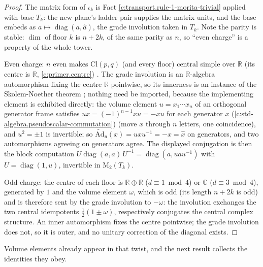 \documentclass[11pt]{article}
\theoremstyle{definition}
\theoremstyle{plain}
\providecommand{\Ad}{}\renewcommand{\Ad}{\widetilde{\mathrm{Ad}}}
\providecommand{\C}{}\renewcommand{\C}{\mathbb{C}}
\providecommand{\Cl}{}\renewcommand{\Cl}{\mathrm{Cl}}
\providecommand{\Mat}{}\renewcommand{\Mat}{\mathrm{M}}
\providecommand{\R}{}\renewcommand{\R}{\mathbb{R}}
\begin{document}
\begin{proof}
The matrix form of $\iota_k$ is Fact \ref{c:transport.rule-1-morita-trivial} applied with base $T_k$: the new plane's ladder pair supplies the matrix units, and the base embeds as $a \mapsto \operatorname{diag}(a, \hat a)$, the grade involution taken in $T_k$. Note the parity is stable: $\dim$ of floor $k$ is $n + 2k$, of the same parity as $n$, so ``even charge'' is a property of the whole tower.

Even charge: $n$ even makes $\Cl(p,q)$ (and every floor) central simple over $\R$ (its centre is $\R$, \ref{c:primer.centre}) \cite{Porteous1995, Lounesto2001}. The grade involution is an $\R$-algebra automorphism fixing the centre $\R$ pointwise, so its innerness is an instance of the Skolem-Noether theorem \cite{Pierce1982}; nothing need be imported, because the implementing element is exhibited directly: the volume element $u = x_1 \cdots x_n$ of an orthogonal generator frame satisfies $u x = (-1)^{n-1} x u = -xu$ for each generator $x$ (\ref{c:std-algebra.pseudoscalar-commutation}) (move $x$ through $n$ letters, one coincidence), and $u^2 = \pm 1$ is invertible; so $\Ad_u(x) = u x u^{-1} = -x = \hat x$ on generators, and two automorphisms agreeing on generators agree. The displayed conjugation is then the block computation $U \operatorname{diag}(a,a)\, U^{-1} = \operatorname{diag}(a, u a u^{-1})$ with $U = \operatorname{diag}(1, u)$, invertible in $\Mat_2(T_k)$.

Odd charge: the centre of each floor is $\R \oplus \R$ ($d \equiv 1 \bmod 4$) or $\C$ ($d \equiv 3 \bmod 4$), generated by $1$ and the volume element $\omega$, which is odd (its length $n + 2k$ is odd) and is therefore sent by the grade involution to $-\omega$: the involution exchanges the two central idempotents $\tfrac12(1 \pm \omega)$, respectively conjugates the central complex structure. An inner automorphism fixes the centre pointwise; the grade involution does not, so it is outer, and no unitary correction of the diagonal exists.

\end{proof}

Volume elements already appear in that twist, and the next result collects the identities they obey.
\end{document}
